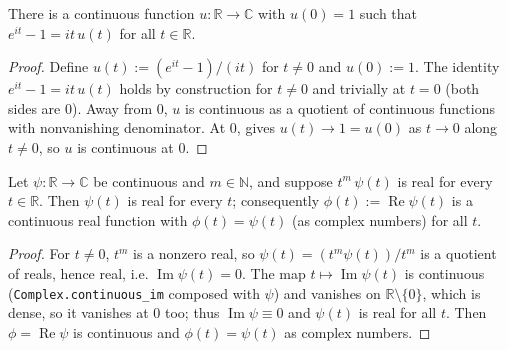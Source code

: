 \begin{lemma}
    \label{lem:exp-expansion}
    \leanok
    There is a continuous function $u : \mathbb{R} \to \mathbb{C}$ with
    $u(0) = 1$ such that $e^{i t} - 1 = i t\,u(t)$ for all $t \in \mathbb{R}$.
\end{lemma}
\begin{proof}
    Define $u(t) := (e^{i t} - 1)/(i t)$ for $t \neq 0$ and $u(0) := 1$. The
    identity $e^{i t} - 1 = i t\,u(t)$ holds by construction for $t \neq 0$ and
    trivially at $t = 0$ (both sides are $0$). Away from $0$, $u$ is continuous
    as a quotient of continuous functions with nonvanishing denominator. At $0$,
     gives $u(t) \to 1 = u(0)$ as $t \to 0$ along
    $t \neq 0$, so $u$ is continuous at $0$.
\end{proof}

\begin{lemma}
    \label{lem:psi-real}
    \leanok
    Let $\psi : \mathbb{R} \to \mathbb{C}$ be continuous and $m \in \mathbb{N}$,
    and suppose $t^{m}\,\psi(t)$ is real for every $t \in \mathbb{R}$. Then
    $\psi(t)$ is real for every $t$; consequently
    $\phi(t) := \operatorname{Re}\psi(t)$ is a continuous real function with
    $\phi(t) = \psi(t)$ (as complex numbers) for all $t$.
\end{lemma}
\begin{proof}
    For $t \neq 0$, $t^{m}$ is a nonzero real, so
    $\psi(t) = (t^{m}\psi(t))/t^{m}$ is a quotient of reals, hence real, i.e.
    $\operatorname{Im}\psi(t) = 0$. The map $t \mapsto \operatorname{Im}\psi(t)$
    is continuous (\texttt{Complex.continuous\_im} composed with $\psi$) and
    vanishes on $\mathbb{R}\setminus\{0\}$, which is dense, so it vanishes at $0$
    too; thus $\operatorname{Im}\psi \equiv 0$ and $\psi(t)$ is real for all $t$.
    Then $\phi = \operatorname{Re}\psi$ is continuous and $\phi(t) = \psi(t)$ as
    complex numbers.
\end{proof}

